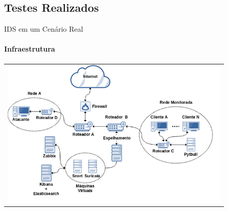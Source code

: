 \documentclass[aspectratio=169]{beamer}
\begin{document}
\subsection{Testes Realizados}
\begin{frame}{IDS em um Cenário Real}
    \framesubtitle{Infraestrutura}
    \begin{minipage}{\linewidth}
        \begin{tabular}{c}
            \includegraphics[width=11cm]{imagens/infra.png}
        \end{tabular}
    \end{minipage}
\end{frame}
\end{document}
